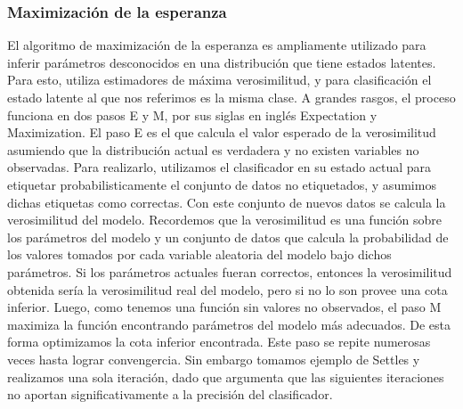 \subsubsection{Maximización de la esperanza}
El algoritmo de maximización de la esperanza es ampliamente utilizado para inferir parámetros desconocidos en una distribución que tiene estados latentes. Para esto, utiliza estimadores de máxima verosimilitud, y para clasificación el estado latente al que nos referimos es la misma clase. A grandes rasgos, el proceso funciona en dos pasos E y M, por sus siglas en inglés Expectation y Maximization.
El paso E es el que calcula el valor esperado de la verosimilitud asumiendo que la distribución actual es verdadera y no existen variables no observadas. Para realizarlo, utilizamos el clasificador en su estado actual para etiquetar probabilisticamente el conjunto de datos no etiquetados, y asumimos dichas etiquetas como correctas. Con este conjunto de nuevos datos se calcula la verosimilitud del modelo.
Recordemos que la verosimilitud es una función sobre los parámetros del modelo y un conjunto de datos que calcula la probabilidad de los valores tomados por cada variable aleatoria del modelo bajo dichos parámetros.
Si los parámetros actuales fueran correctos, entonces la verosimilitud obtenida sería la verosimilitud real del modelo, pero si no lo son provee una cota inferior. Luego, como tenemos una función sin valores no observados, el paso M maximiza la función encontrando parámetros del modelo más adecuados. De esta forma optimizamos la cota inferior encontrada.
Este paso se repite numerosas veces hasta lograr convengercia. Sin embargo tomamos ejemplo de Settles y realizamos una sola iteración, dado que argumenta que las siguientes iteraciones no aportan significativamente a la precisión del clasificador.




